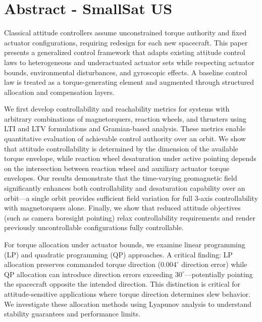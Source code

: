 \documentclass[conference]{IEEEtran}
\begin{document}
\section{Abstract - SmallSat US}

Classical attitude controllers assume unconstrained torque authority and fixed actuator configurations, requiring redesign for each new spacecraft. This paper presents a generalized control framework that adapts existing attitude control laws to heterogeneous and underactuated actuator sets while respecting actuator bounds, environmental disturbances, and gyroscopic effects. A baseline control law is treated as a torque-generating element and augmented through structured allocation and compensation layers.

We first develop controllability and reachability metrics for systems with arbitrary combinations of magnetorquers, reaction wheels, and thrusters using LTI and LTV formulations and Gramian-based analysis. These metrics enable quantitative evaluation of achievable control authority over an orbit. We show that attitude controllability is determined by the dimension of the available torque envelope, while reaction wheel desaturation under active pointing depends on the intersection between reaction wheel and auxiliary actuator torque envelopes. Our results demonstrate that the time-varying geomagnetic field significantly enhances both controllability and desaturation capability over an orbit---a single orbit provides sufficient field variation for full 3-axis controllability with magnetorquers alone. Finally, we show that reduced attitude objectives (such as camera boresight pointing) relax controllability requirements and render previously uncontrollable configurations fully controllable.

For torque allocation under actuator bounds, we examine linear programming (LP) and quadratic programming (QP) approaches. A critical finding: LP allocation preserves commanded torque direction ($0.004^\circ$ direction error) while QP allocation can introduce direction errors exceeding $30^\circ$---potentially pointing the spacecraft opposite the intended direction. This distinction is critical for attitude-sensitive applications where torque direction determines slew behavior. We investigate these allocation methods using Lyapunov analysis to understand stability guarantees and performance limits.
\end{document}
